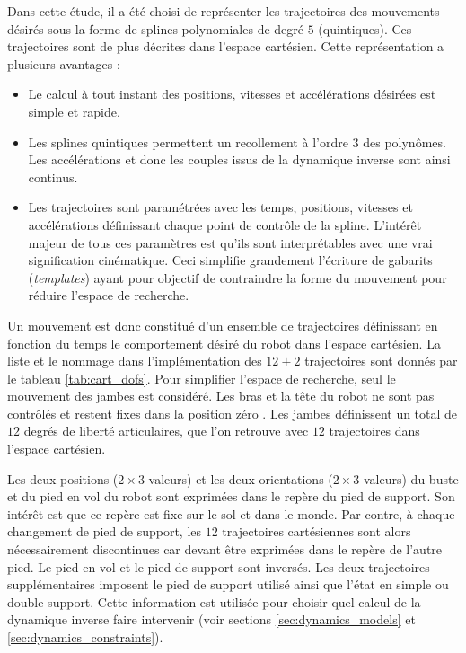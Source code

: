 Dans cette étude, il a été choisi de représenter
les trajectoires des mouvements désirés sous la forme de 
splines polynomiales de degré $5$ (quintiques).
Ces trajectoires sont de plus décrites dans l'espace cartésien.
Cette représentation a plusieurs avantages :
\begin{itemize}
    \item Le calcul à tout instant des positions, 
        vitesses et accélérations désirées est simple et rapide.
    \item Les splines quintiques permettent un recollement
        à l'ordre $3$ des polynômes. Les accélérations
        et donc les couples issus de la dynamique inverse 
        sont ainsi continus.
    \item Les trajectoires sont paramétrées avec les temps,
        positions, vitesses et accélérations
        définissant chaque point de contrôle de la spline.
        L'intérêt majeur de tous ces paramètres est qu'ils sont 
        interprétables avec une vrai signification cinématique.
        Ceci simplifie grandement l'écriture de gabarits 
        (\textit{templates}) ayant pour objectif de contraindre
        la forme du mouvement pour réduire l'espace de recherche.\\
\end{itemize}

Un mouvement est donc constitué d'un ensemble de trajectoires
définissant en fonction du temps le comportement désiré du robot
dans l'espace cartésien.
La liste et le nommage dans l'implémentation des $12+2$ trajectoires
sont donnés par le tableau \ref{tab:cart_dofs}.
Pour simplifier l'espace de recherche, seul le mouvement 
des jambes est considéré. Les bras et la tête du robot ne sont
pas contrôlés et restent fixes dans la position \og zéro \fg.
Les jambes définissent un total de $12$ degrés de liberté articulaires,
que l'on retrouve avec $12$ trajectoires dans l'espace cartésien.

Les deux positions ($2\times3$ valeurs) et les deux orientations ($2\times3$ valeurs) 
du buste et du pied en vol du robot sont exprimées dans le repère du pied de support.
Son intérêt est que ce repère est fixe sur le sol et dans le monde.
Par contre, à chaque changement de pied de support,
les $12$ trajectoires cartésiennes sont alors nécessairement 
discontinues car devant être exprimées dans le repère de l'autre pied.
Le pied en vol et le pied de support sont inversés.
Les deux trajectoires supplémentaires imposent le pied de support utilisé 
ainsi que l'état en simple ou double support.
Cette information est utilisée pour choisir quel calcul de la dynamique inverse
faire intervenir (voir sections \ref{sec:dynamics_models} et \ref{sec:dynamics_constraints}).

